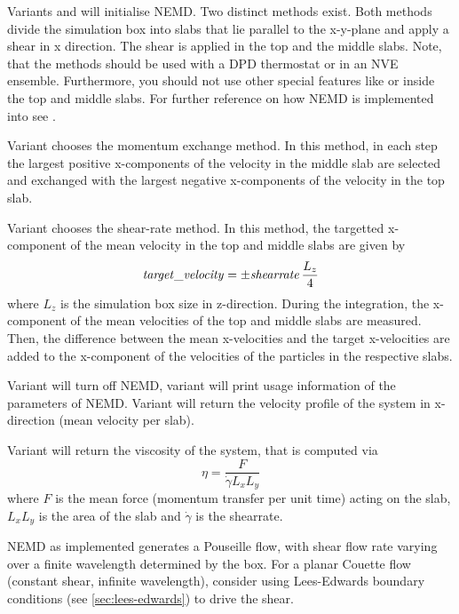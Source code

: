 Variants  and  will initialise NEMD. Two
distinct methods exist.  Both methods divide the simulation box into
 slabs that lie parallel to the x-y-plane and apply a
shear in x direction.  The shear is applied in the top and the middle
slabs. Note, that the methods should be used with a DPD thermostat or
in an NVE ensemble.  Furthermore, you should not use other special
features like  or  inside the
top and middle slabs. For further reference on how NEMD is implemented
into \es see \cite{soddeman01a}.


Variant  chooses the momentum exchange method.  In this
method, in each step the  largest positive
x-components of the velocity in the middle slab are selected and
exchanged with the  largest negative x-components of
the velocity in the top slab. 

Variant  chooses the shear-rate method. In this method, the
targetted x-component of the mean velocity in the top and middle slabs
are given by 
\begin{equation}
  \mathrm{\mathit{target\_velocity}} = \pm \mathrm{\mathit{shearrate}}\,\frac{L_z}{4}
\end{equation}
where $L_z$ is the simulation box size in z-direction. During the
integration, the x-component of the mean velocities of the top and
middle slabs are measured.  Then, the difference between the mean
x-velocities and the target x-velocities are added to the x-component
of the velocities of the particles in the respective slabs. 

Variant  will turn off NEMD, variant  will
print usage information of the parameters of NEMD. Variant  will return the
velocity profile of the system in x-direction (mean velocity per slab).

Variant  will return the viscosity of the system, that is
computed via
\begin{equation}
  \eta = \frac{F}{\dot{\gamma} L_x L_y}
\end{equation}
where $F$ is the mean force (momentum transfer per unit time) acting
on the slab, $L_x L_y$ is the area of the slab and $\dot{\gamma}$ is the shearrate. 

NEMD as implemented generates a Pouseille flow, with shear flow rate varying over a finite wavelength determined by the box. For a planar Couette flow (constant shear, infinite wavelength), consider using Lees-Edwards boundary conditions (see \vref{sec:lees-edwards}) to drive the shear.

